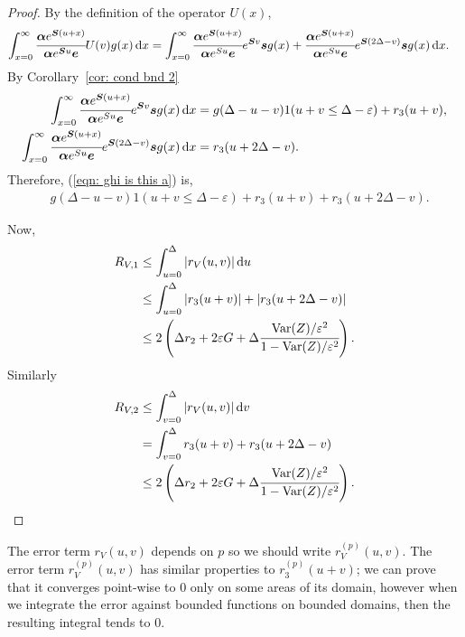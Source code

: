 \begin{proof}
	By the definition of the operator \(U(x)\), 
	\begin{align}
		\int_{x=0}^\infty \cfrac{\boldsymbol \alpha  e^{\boldsymbol{S} (u+x)} }{\boldsymbol \alpha  e^{\boldsymbol{S} u} \boldsymbol e} U(v)g(x)\, \mathrm{d} x 		
		&=
			\displaystyle\int_{x=0}^\infty 
				\cfrac{
					\boldsymbol \alpha e^{\boldsymbol S(u+x)}
					}{
					\boldsymbol \alpha e^{Su}\boldsymbol e
					} 
				e^{\boldsymbol{S}v}\boldsymbol s g(x)
				+
				\cfrac{
					\boldsymbol \alpha e^{\boldsymbol S(u+x)}
					}{
					\boldsymbol \alpha e^{Su}\boldsymbol e
					} 
				e^{\boldsymbol{S}(2\Delta-v)}\boldsymbol sg(x) \, \mathrm{d} x. \label{eqn: ghi is this a}
	\end{align}
	By Corollary~\ref{cor: cond bnd 2} 
	\begin{align}
		\int_{x=0}^\infty 
				\cfrac{
					\boldsymbol \alpha e^{\boldsymbol S(u+x)}
					}{
					\boldsymbol \alpha e^{Su}\boldsymbol e
					} 
				e^{\boldsymbol{S}v}\boldsymbol s g(x)\, \mathrm{d} x 
				&= g(\Delta-u-v) 1(u+v\leq\Delta-\varepsilon) + r_3 (u+v), \label{eqn: dkskkk2}
		\\
		\int_{x=0}^\infty\cfrac{
					\boldsymbol \alpha e^{\boldsymbol S(u+x)}
					}{
					\boldsymbol \alpha e^{Su}\boldsymbol e
					} 
				e^{\boldsymbol{S}(2\Delta-v)}\boldsymbol sg(x) \, \mathrm{d} x 
				&= r_3 (u+2\Delta - v).
	\end{align}
	Therefore, (\ref{eqn: ghi is this a}) is, 
	\begin{align}
		&g(\Delta-u-v) 1(u+v\leq\Delta-\varepsilon) + r_3 (u+v) + r_3 (u+2\Delta - v).
	\end{align}	
	
	Now,
	\begin{align*}
		R_{V,1}&\leq \int_{u=0}^{\Delta}| r_V(u,v)|\, \mathrm{d} u
		\\& \leq \int_{u=0}^{\Delta} |r_3 (u+v)| + |r_3 (u+2\Delta - v) |
		\\&\leq 2\left(\Delta r_2 + 2\varepsilon G + \Delta\cfrac{\mathrm{Var}(Z)/\varepsilon^2}{1-\mathrm{Var}(Z)/\varepsilon^2}\right).
	\end{align*}
	Similarly 
	\begin{align*}
		R_{V,2}&\leq \int_{v=0}^{\Delta}| r_V(u,v)|\, \mathrm{d} v
		\\&= \int_{v=0}^{\Delta} r_3(u+v) + r_3(u+2\Delta-v) 
		\\& \leq 2\left(\Delta r_2 + 2\varepsilon G + \Delta\cfrac{\mathrm{Var}(Z)/\varepsilon^2}{1-\mathrm{Var}(Z)/\varepsilon^2}\right).
	\end{align*}
\end{proof}

The error term \(r_V(u,v)\) depends on \(p\) so we should write \(r_V^{(p)}(u,v)\). The error term \(r_V^{(p)}(u,v)\) has similar properties to \(r_3^{(p)}(u+v)\); we can prove that it converges point-wise to \(0\) only on some areas of its domain, however when we integrate the error against bounded functions on bounded domains, then the resulting integral tends to \(0\). 


